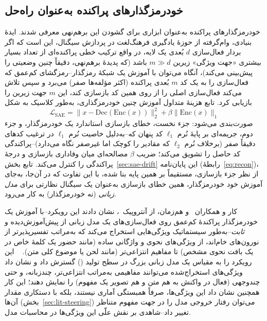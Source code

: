 \subsection{خودرمزگذارهای پراکنده به‌عنوان راه‌حل}
خودرمزگذارهای پراکنده
به‌عنوان ابزاری برای گشودن این برهم‌نهی معرفی شدند. ایدهٔ بنیادی، وام‌گرفته از حوزهٔ یادگیری فرهنگ‌لغت
در پردازش سیگنال، این است که اگر بردار فعال‌سازی
$d$
بُعدی یک لایه، در واقع ترکیب خطی پراکنده‌ای از تعداد بسیار بیشتری «جهت ویژگی» زیرین
$m \gg d$
باشد (که پدیدهٔ برهم‌نهی، دقیقاً چنین وضعیتی را پیش‌بینی می‌کند)، آنگاه می‌توان با آموزش یک شبکهٔ رمزگذار--رمزگشای کم‌عمق که فعال‌سازی را به یک کد
$m$
بُعدی پراکنده (اکثر مؤلفه‌ها صفر) می‌برد و سپس تلاش می‌کند فعال‌سازی اصلی را از روی همین کد بازسازی کند، این
$m$
جهت زیرین را بازیابی کرد. تابع هزینهٔ متداول آموزش چنین خودرمزگذاری، به‌طور کلاسیک به شکل
\begin{equation}
\mathcal{L}_{\mathrm{SAE}} = \lVert x - \mathrm{Dec}(\mathrm{Enc}(x)) \rVert_2^2 + \beta \lVert \mathrm{Enc}(x) \rVert_1
\end{equation}
صورت‌بندی می‌شود: جزء نخست، خطای بازسازی استاندارد یک خودرمزگذار، و جزء دوم، جریمه‌ای بر پایهٔ نُرم
$\ell_1$
کد پنهان که--به‌دلیل خاصیت نُرم
$\ell_1$
در ترغیب کدهای دقیقاً صفر (برخلاف نُرم
$\ell_2$
که مقادیر را کوچک اما غیرصفر نگاه می‌دارد)--پراکندگی کد حاصل را تشویق می‌کند؛ ضریب
$\beta$
مصالحه‌ای میان وفاداری بازسازی و درجهٔ پراکندگی را کنترل می‌کند. تابع بخش~\ref{sec:sae-drift} این پایان‌نامه (رابطهٔ~\ref{eq:recon})، از نظر جزء بازسازی، مستقیماً بر همین پایه بنا شده، با این تفاوت که در آن‌جا، به‌جای آموزش خود خودرمزگذار، همین خطای بازسازی به‌عنوان یک سیگنال نظارتی برای \emph{مدل زبانی} (نه خودرمزگذار) به کار می‌رود.

کار
و همکاران~\cite{cunningham2023sae}
و هم‌زمان،
از آنتروپیک~\cite{bricken2023monosemanticity}، نشان دادند این رویکرد--با آموزش یک خودرمزگذار پراکندهٔ کم‌عمق روی فعال‌سازی‌های یک مدل زبانی از پیش‌آموزش‌دیده و \emph{ثابت}--به‌طور سیستماتیک ویژگی‌هایی استخراج می‌کند که به‌مراتب تفسیرپذیرتر از نورون‌های خام‌اند، از ویژگی‌های نحوی و واژگانی ساده (مانند حضور یک کلمهٔ خاص در یک بافت نحوی مشخص) تا مفاهیم انتزاعی‌تر (مانند لحن یا موضوع کلی متن).
~\cite{templeton2024scaling}
این رویکرد را به مقیاس یک مدل زبانی بزرگ در سطح تولید
() گسترش داد و نشان داد ویژگی‌های استخراج‌شده می‌توانند مفاهیمی به‌مراتب انتزاعی‌تر، چندزبانه، و حتی چندوجهی (فعال در واکنش به هم متن و هم تصویر یک مفهوم) را نمایش دهند؛ این کار همچنین نشان داد این ویژگی‌ها، صرفاً همبستگی آماری نیستند، بلکه با دستکاری مقدار آن‌ها (بخش~\ref{sec:lit-steering}) می‌توان رفتار خروجی مدل را در جهت مفهوم متناظر تغییر داد--شاهدی بر نقش علّی این ویژگی‌ها در محاسبات مدل.

